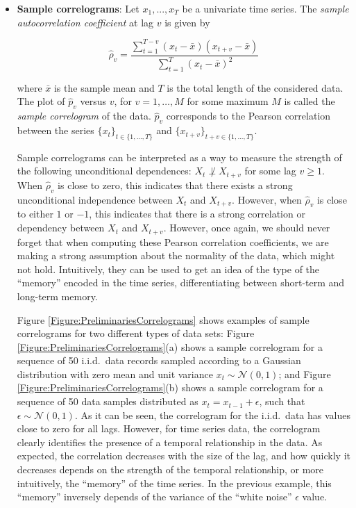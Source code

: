 \begin{itemize}
\item \textbf{Sample correlograms}: Let ${x_1,...,x_T}$ be a univariate time series. The \emph{sample autocorrelation coefficient} at lag $v$ is given by 

$$ \hat{\rho}_v =\frac{\sum_{t=1}^{T-v} (x_t-\bar{x})(x_{t+v}-\bar{x})}{\sum_{t=1}^{T} (x_t-\bar{x})^2}$$ 

\noindent where $\bar{x}$ is the sample mean and $T$ is the total length of the considered data. The plot of $\hat{p}_v$ versus $v$, for $v=1,\ldots, M$ for some maximum $M$ is called the \emph{sample correlogram} of the data. $\hat{p}_v$ corresponds to the Pearson correlation between the series $\{x_t\}_{t\in\{1,...,T\}}$ and $\{x_{t+v}\}_{t+v\in\{1,...,T\}}$.

Sample correlograms can be interpreted as a way to measure the strength of the following unconditional dependences: $X_t  \not\perp X_{t+v}$ for some lag $v \geq 1$.  When $\hat{\rho}_v$ is close to zero, this indicates that there exists a strong unconditional independence between $X_t$ and $X_{t+v}$. However, when $\hat{\rho}_v$ is close to either $1$ or $-1$, this indicates that there is a strong correlation or dependency between $X_t$ and $X_{t+v}$. However, once again, we should never forget that when computing these Pearson correlation coefficients, we are making a strong assumption about the normality of the data, which might not hold. Intuitively, they can be used to get an idea of the type of the ``memory'' encoded in the time series, differentiating between short-term and long-term memory. 

Figure \ref{Figure:PreliminariesCorrelograms} shows examples of sample correlograms for two different types of data sets: Figure \ref{Figure:PreliminariesCorrelograms}(a) shows a sample correlogram for a sequence of 50 i.i.d.\ data records sampled according to a Gaussian distribution with zero mean and unit variance $x_t\sim {\mathcal N}(0,1)$; and Figure \ref{Figure:PreliminariesCorrelograms}(b) shows a sample correlogram for a sequence of 50 data samples distributed as $x_t=x_{t-1} + \epsilon$, such that $\epsilon\sim {\mathcal N}(0,1)$. As it can be seen, the correlogram for the i.i.d.\ data has values close to zero for all lags. However, for time series data, the correlogram clearly identifies the presence of a temporal relationship in the data. As expected, the correlation decreases with the size of the lag, and how quickly it decreases depends on the strength of the temporal relationship, or more intuitively, the ``memory'' of the time series. In the previous example, this ``memory'' inversely depends of the variance of the ``white noise'' $\epsilon$ value.


\end{itemize}
